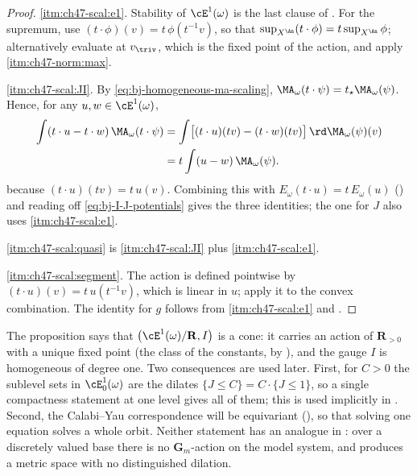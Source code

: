 \begin{proof}
\cref{itm:ch47-scal:e1}.  Stability of $\cE^1(\omega)$ is the last clause
of .  For the supremum, use
$(t\cdot\phi)(v)=t\,\phi(t^{-1}v)$, so that
$\sup_{X^{\An}}(t\cdot\phi)=t\sup_{X^{\An}}\phi$; alternatively evaluate
at $v_{\triv}$, which is the fixed point of the action, and apply
\,\cref{itm:ch47-norm:max}.

\cref{itm:ch47-scal:JI}.  By \eqref{eq:bj-homogeneous-ma-scaling},
$\MA_\omega(t\cdot\psi)=t_\star\MA_\omega(\psi)$.  Hence, for any
$u,w\in\cE^1(\omega)$,
\[
 \begin{aligned}
 \int(t\cdot u-t\cdot w)\,\MA_\omega(t\cdot\psi)
 &=\int\bigl[(t\cdot u)(t v)-(t\cdot w)(tv)\bigr]\,
      \rd\MA_\omega(\psi)(v)\\
 &=t\int(u-w)\,\MA_\omega(\psi).
 \end{aligned}
\]
because $(t\cdot u)(tv)=t\,u(v)$.  Combining this with
$E_\omega(t\cdot u)=t\,E_\omega(u)$
() and reading off
\eqref{eq:bj-I-J-potentials} gives the three identities; the one for $J$
also uses \cref{itm:ch47-scal:e1}.

\cref{itm:ch47-scal:quasi} is \cref{itm:ch47-scal:JI} plus
\cref{itm:ch47-scal:e1}.

\cref{itm:ch47-scal:segment}.  The action is defined pointwise by
$(t\cdot u)(v)=t\,u(t^{-1}v)$, which is linear in $u$; apply it to the
convex combination.  The identity for $g$ follows from
\cref{itm:ch47-scal:e1} and .
\end{proof}

\begin{remark}
\label{rem:ch47-cone-reading}
The proposition says that $\bigl(\cE^1(\omega)/\mathbf R,I\bigr)$ is a
cone: it carries an action of $\mathbf R_{>0}$ with a unique fixed point
(the class of the constants, by
), and the gauge $I$ is homogeneous of degree
one.  Two consequences are used later.  First, for $C>0$ the sublevel sets in $\cE^1_0(\omega)$ are the dilates
$\{J\le C\}=C\cdot\{J\le1\}$, so a single compactness
statement at one level gives all of them; this is used implicitly in
.  Second, the Calabi--Yau correspondence will be
equivariant (), so that solving one equation
solves a whole orbit.  Neither statement has an analogue in
: over a discretely valued base there
is no $\mathbf G_m$-action on the model system, and
 produces a metric space with no
distinguished dilation.
\end{remark}

